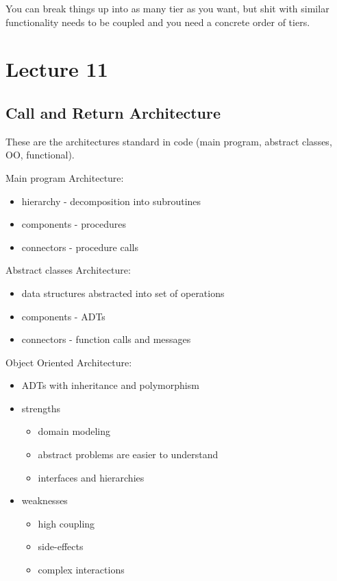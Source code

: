 \documentclass{article}
\begin{document}
You can break things up into as many tier as you want, but shit with similar functionality needs to be coupled and you need a concrete order of tiers.

\section*{Lecture 11} %
\label{sec:lecture_11}
\subsection*{Call and Return Architecture} %
\label{sub:call_and_return_architecture}
These are the architectures standard in code (main program, abstract classes, OO, functional).

Main program Architecture:
\begin{itemize}
    \item hierarchy - decomposition into subroutines
    \item components - procedures
    \item connectors - procedure calls
\end{itemize}

Abstract classes Architecture:
\begin{itemize}
    \item data structures abstracted into set of operations
    \item components - ADTs
    \item connectors - function calls and messages
\end{itemize}

Object Oriented Architecture:
\begin{itemize}
    \item ADTs with inheritance and polymorphism
    \item strengths
    \begin{itemize}
        \item domain modeling
        \item abstract problems are easier to understand
        \item interfaces and hierarchies
    \end{itemize}
    \item weaknesses
    \begin{itemize}
        \item high coupling
        \item side-effects
        \item complex interactions
    \end{itemize}
\end{itemize}
\end{document}
